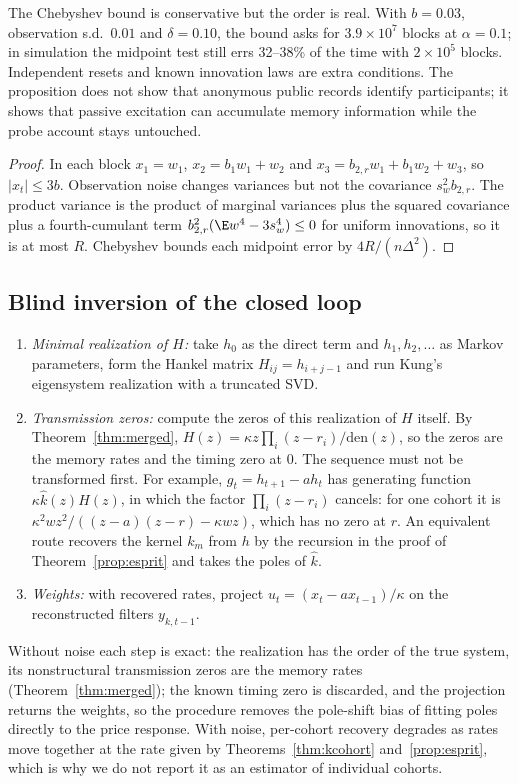 The Chebyshev bound is conservative but the order is real. With $b=0.03$, observation s.d.\ $0.01$ and $\delta=0.10$, the bound asks for $3.9\times10^7$ blocks at $\alpha=0.1$; in simulation the midpoint test still errs 32--38\% of the time with $2\times10^5$ blocks. Independent resets and known innovation laws are extra conditions. The proposition does not show that anonymous public records identify participants; it shows that passive excitation can accumulate memory information while the probe account stays untouched.

\begin{proof} In each block $x_1=w_1$, $x_2=b_1w_1+w_2$ and $x_3=b_{2,r}w_1+b_1w_2+w_3$, so $|x_t|\le3b$. Observation noise changes variances but not the covariance $s_w^2b_{2,r}$. The product variance is the product of marginal variances plus the squared covariance plus a fourth-cumulant term $b_{2,r}^2(\E w^4-3s_w^4)\le0$ for uniform innovations, so it is at most $R$. Chebyshev bounds each midpoint error by $4R/(n\Delta^2)$.
\end{proof}

\subsection{Blind inversion of the closed loop}\label{app:era}
\begin{enumerate}[itemsep=1pt]
\item \emph{Minimal realization of $H$:} take $h_0$ as the direct term and $h_1,h_2,\ldots$ as Markov parameters, form the Hankel matrix $H_{ij}=h_{i+j-1}$ and run Kung's eigensystem realization with a truncated SVD.
\item \emph{Transmission zeros:} compute the zeros of this realization of $H$ itself. By Theorem~\ref{thm:merged}, $H(z)=\kappa z\prod_i(z-r_i)/\mathrm{den}(z)$, so the zeros are the memory rates and the timing zero at $0$. The sequence must not be transformed first. For example, $g_t=h_{t+1}-ah_t$ has generating function $\kappa\hat k(z)H(z)$, in which the factor $\prod_i(z-r_i)$ cancels: for one cohort it is $\kappa^2wz^2/((z-a)(z-r)-\kappa wz)$, which has no zero at $r$. An equivalent route recovers the kernel $k_m$ from $h$ by the recursion in the proof of Theorem~\ref{prop:esprit} and takes the poles of $\hat k$.
\item \emph{Weights:} with recovered rates, project $u_t=(x_t-ax_{t-1})/\kappa$ on the reconstructed filters $y_{k,t-1}$.
\end{enumerate}
Without noise each step is exact: the realization has the order of the true system, its nonstructural transmission zeros are the memory rates (Theorem~\ref{thm:merged}); the known timing zero is discarded, and the projection returns the weights, so the procedure removes the pole-shift bias of fitting poles directly to the price response. With noise, per-cohort recovery degrades as rates move together at the rate given by Theorems~\ref{thm:kcohort} and~\ref{prop:esprit}, which is why we do not report it as an estimator of individual cohorts.

